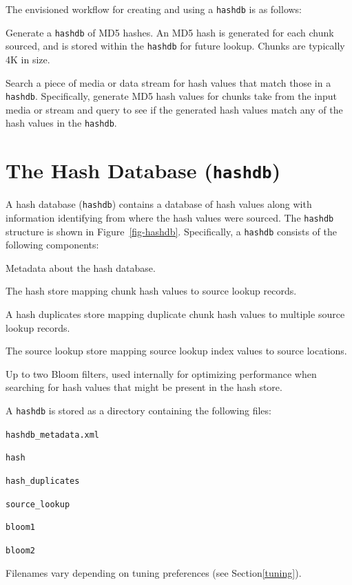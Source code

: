 \documentclass[10pt,twoside]{article}
\newcommand{\hdb}{\texttt{hashdb}\xspace}
\begin{document}
The envisioned workflow for creating and using a \hdb is as follows:
\begin{compactenum}
\item Generate a \hdb of MD5 hashes.
      An MD5 hash is generated for each chunk sourced,
      and is stored within the \hdb for future lookup.
      Chunks are typically 4K in size.
\item Search a piece of media or data stream for hash values that match those in a \hdb.
      Specifically, generate MD5 hash values for chunks take from
      the input media or stream
      and query to see if the generated hash values match any of the hash values in the \hdb.
\end{compactenum}

\section{The Hash Database (\hdb)}
A hash database (\hdb) contains a database of hash values along with information
identifying from where the hash values were sourced.
The \hdb structure is shown in Figure~\ref{fig-hashdb}.
Specifically, a \hdb consists of the following components:
\begin{compactitem}
\item Metadata about the hash database.
\item The hash store mapping chunk hash values to source lookup records.
\item A hash duplicates store mapping duplicate chunk hash values to multiple source lookup records.
\item The source lookup store mapping source lookup index values to source locations.
\item Up to two Bloom filters, used internally for optimizing performance
      when searching for hash values that might be present in the hash store.
\end{compactitem}
A \hdb is stored as a directory containing the following files:
\begin{compactitem}
\item \texttt{hashdb\_metadata.xml}
\item \texttt{hash}
\item \texttt{hash\_duplicates}
\item \texttt{source\_lookup}
\item \texttt{bloom1}
\item \texttt{bloom2}
\end{compactitem}
Filenames vary depending on tuning preferences (see Section\ref{tuning}). 
\end{document}
